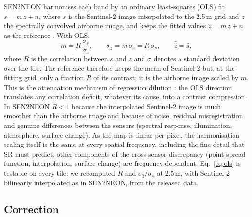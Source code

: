 \documentclass[pdflatex,sn-basic,referee,lineno]{sn-jnl}
\begin{document}
SEN2NEON harmonises each band by an ordinary least-squares (OLS) fit $s = m\,z + n$, where $s$ is the Sentinel-2
image interpolated to the 2.5\,m grid and $z$ the spectrally convolved airborne image, and keeps the fitted values
$\hat z = m\,z + n$ as the reference \citep[Eq.~2]{donike2026sen2neon}. With OLS,
\begin{equation}
m = R\,\frac{\sigma_s}{\sigma_z}, \qquad \sigma_{\hat z} = m\,\sigma_z = R\,\sigma_s, \qquad
\bar{\hat z} = \bar s, \label{eq:ols}
\end{equation}
where $R$ is the correlation between $s$ and $z$ and $\sigma$ denotes a standard deviation over the tile. The
reference therefore keeps the mean of Sentinel-2 but, at the fitting grid, only a fraction $R$ of its contrast; it
is the airborne image scaled by $m$. This is the attenuation mechanism of regression dilution
\citep{frost2000dilution}: the OLS direction
translates any correlation deficit, whatever its cause, into a contrast compression. In SEN2NEON $R<1$ because the
interpolated Sentinel-2 image is much smoother than the airborne image and because of noise, residual
misregistration and genuine differences between the sensors (spectral response, illumination, atmosphere, surface
change). As the map is linear per pixel, the harmonisation scaling itself is the same at every spatial frequency,
including the fine detail that SR must predict; other components of the cross-sensor discrepancy (point-spread
function, interpolation, surface change) are frequency-dependent. Eq.~\eqref{eq:ols} is testable on every tile: we recomputed $R$ and
$\sigma_{\hat z}/\sigma_s$ at 2.5\,m, with Sentinel-2 bilinearly interpolated as in SEN2NEON, from the released data.

\subsection{Correction}\label{sec:correction}
\end{document}

